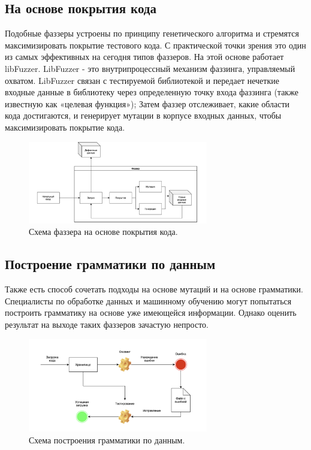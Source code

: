 \documentclass[areasetadvanced]{scrartcl}
\begin{document}
\subsection{На основе покрытия кода}
Подобные фаззеры устроены по принципу генетического алгоритма и стремятся максимизировать
покрытие тестового кода. С практической точки зрения это один из самых эффективных на сегодня
типов фаззеров. На этой основе работает libFuzzer.
LibFuzzer - это внутрипроцессный механизм фаззинга, управляемый охватом.
LibFuzzer связан с тестируемой библиотекой и передает нечеткие входные данные в библиотеку
через определенную точку входа фаззинга (также известную как «целевая функция»); Затем
фаззер отслеживает, какие области кода достигаются, и генерирует мутации в корпусе входных
данных, чтобы максимизировать покрытие кода.
\begin{figure}[H]
    \begin{center}
      \centering
      \includegraphics[width=0.7\textwidth]{image copy.png}
      \caption{Схема фаззера на основе покрытия кода.}
      \label{fig:syntdiag}
    \end{center}
  \end{figure}
\newpage
\subsection{Построение грамматики по данным}
Также есть способ сочетать подходы на основе мутаций и на основе грамматики. Специалисты по
обработке данных и машинному обучению могут попытаться построить грамматику на основе уже
имеющейся информации. Однако оценить результат на выходе таких фаззеров зачастую непросто.
\begin{figure}[H]
    \begin{center}
      \centering
      \includegraphics[width=0.7\textwidth]{image copy 2.png}
      \caption{Схема построения грамматики по данным.}
      \label{fig:syntdiag}
    \end{center}
  \end{figure}
\newpage
\end{document}
